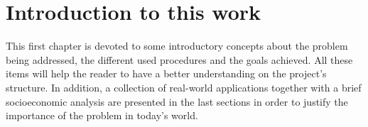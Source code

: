 \chapter{Introduction to this work}

This first chapter is devoted to some introductory concepts about the problem
being addressed, the different used procedures and the goals achieved. All these
items will help the reader to have a better understanding on the project's
structure. In addition, a collection of real-world applications together with a
brief socioeconomic analysis are presented in the last sections in order to
justify the importance of the problem in today's world.





